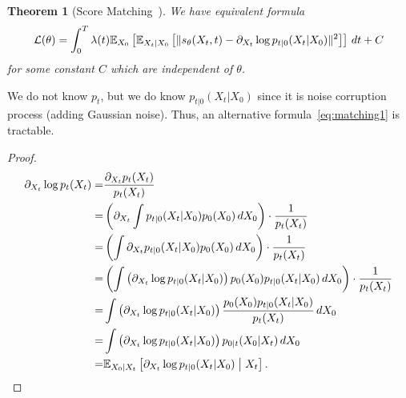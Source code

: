 \documentclass[11pt, a4paper]{article}
\newtheorem{theorem}{Theorem}
\begin{document}
\begin{theorem}[Score Matching~\cite{vincent2011connection}]
    We have equivalent formula
    \begin{align}
        {\cal L}(\theta) = \int_0^T \lambda(t) \mathbb{E}_{X_0}\left[\mathbb{E}_{X_t|X_0}\left[ \| s_\theta(X_t, t)  - \partial_{X_t} \log p_{t|0}(X_t|X_0)\|^2 \right]\right]\, dt + C
        \label{eq:matching1}
    \end{align}
    for some constant $C$ which are independent of $\theta$.
\end{theorem}
We do not know $p_t$, but we do know $p_{t|0}(X_t|X_0)$ since it is noise corruption process (adding Gaussian noise).
Thus, an alternative formula~\eqref{eq:matching1} is tractable.

\begin{proof}
    \begin{align}
        \partial_{X_t} \log p_t (X_t) 
        =&  \frac{\partial_{X_t} p_t(X_t)}{p_t(X_t)}\\
        =&  \left(\partial_{X_t} \int p_{t|0}(X_t|X_0)p_0(X_0) \, dX_0 \right)\cdot \frac{1}{p_t(X_t)} \\
        =&  \left(\int\partial_{X_t}  p_{t|0}(X_t|X_0)p_0(X_0) \, dX_0 \right)\cdot \frac{1}{p_t(X_t)} \\
        =&  \left(\int\left(\partial_{X_t}  \log p_{t|0}(X_t|X_0)\right)p_0(X_0)p_{t|0}(X_t|X_0) \, dX_0 \right)\cdot \frac{1}{p_t(X_t)} \\
        =&  \int\left(\partial_{X_t}  \log p_{t|0}(X_t|X_0)\right)\frac{p_0(X_0)p_{t|0}(X_t|X_0)}{p_t(X_t)} \, dX_0  \\
        =&  \int\left(\partial_{X_t}  \log p_{t|0}(X_t|X_0)\right)p_{0|t}(X_0|X_t) \, dX_0  \\
        =&  \fE_{X_0|X_t}\left[\partial_{X_t}  \log p_{t|0}(X_t|X_0)\suchthat X_t\right].
    \end{align}


\end{proof}
\end{document}
